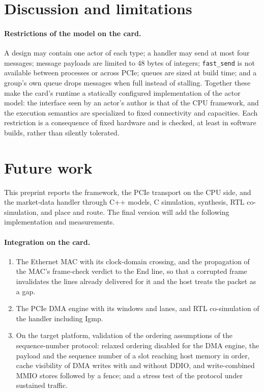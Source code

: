 \documentclass[11pt]{article}
\newcommand{\fs}{\texttt{fast\_send}}
\begin{document}
\section{Discussion and limitations}
\label{sec:discussion}
\label{sec:disc}

\paragraph{Restrictions of the model on the card.} A design may contain one
actor of each type; a handler may send at most four messages; message payloads
are limited to 48 bytes of integers; \fs{} is not available between processes
or across PCIe; queues are sized at build time; and a group's own queue drops
messages when full instead of stalling. Together these make the card's
runtime a statically configured implementation of the actor model: the
interface seen by an actor's author is that of the CPU framework, and the
execution semantics are specialized to fixed connectivity and capacities. Each
restriction is a consequence of fixed hardware and is checked, at least in
software builds, rather than silently tolerated.

\section{Future work}
\label{sec:future}

This preprint reports the framework, the PCIe transport on the CPU side, and the
market-data handler through C++ models, C simulation, synthesis, RTL
co-simulation, and place and route. The final version will add the following
implementation and measurements.

\paragraph{Integration on the card.}
\begin{enumerate}[leftmargin=1.6em]
  \item The Ethernet MAC with its clock-domain crossing, and the propagation of
  the MAC's frame-check verdict to the End line, so that a corrupted frame
  invalidates the lines already delivered for it and the host treats the
  packet as a gap.
  \item The PCIe DMA engine with its windows and lanes, and RTL co-simulation
  of the handler including Igmp.
  \item On the target platform, validation of the ordering assumptions of the
  sequence-number protocol: relaxed ordering disabled for the DMA engine, the
  payload and the sequence number of a slot reaching host memory in order,
  cache visibility of DMA writes with and without DDIO, and write-combined
  MMIO stores followed by a fence; and a stress test of the protocol under
  sustained traffic.
\end{enumerate}
\end{document}
